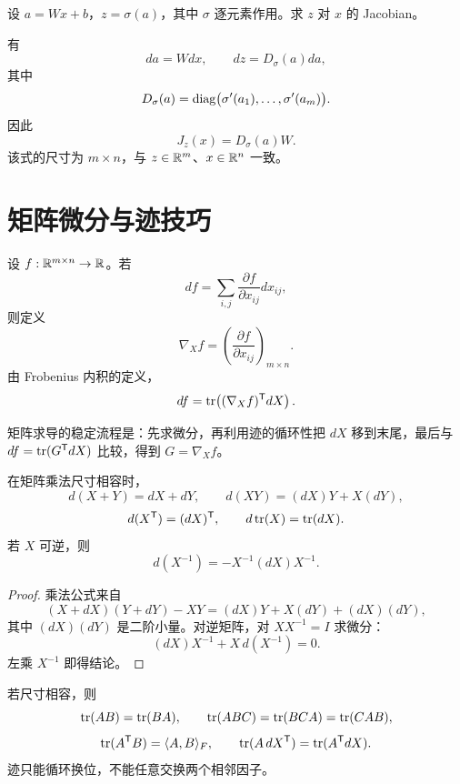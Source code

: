 \begin{example}[title={仿射变换后的逐元素函数}]
设 $a=Wx+b$，$z=\sigma(a)$，其中 $\sigma$ 逐元素作用。求 $z$ 对 $x$ 的 Jacobian。
\begin{solution}
有
\[
da=Wdx,
\qquad
dz=D_\sigma(a)da,
\]
其中
\[
D_\sigma(a)=\operatorname{diag}\bigl(\sigma'(a_1),\ldots,\sigma'(a_m)\bigr).
\]
因此
\[
J_z(x)=D_\sigma(a)W.
\]
该式的尺寸为 $m\times n$，与 $z\in\mathbb{R}^m$、$x\in\mathbb{R}^n$ 一致。
\end{solution}
\end{example}

\section{矩阵微分与迹技巧}

\begin{definition}[矩阵变量的梯度]
设 $f:\mathbb{R}^{m\times n}\to\mathbb{R}$。若
\[
df=\sum_{i,j}\frac{\partial f}{\partial x_{ij}}dx_{ij},
\]
则定义
\[
\nabla_Xf=\left(\frac{\partial f}{\partial x_{ij}}\right)_{m\times n}.
\]
由 Frobenius 内积的定义，
\[
df=\operatorname{tr}\!\left((\nabla_Xf)^{\mathsf T}dX\right).
\]
\end{definition}

矩阵求导的稳定流程是：先求微分，再利用迹的循环性把 $dX$ 移到末尾，最后与
$df=\operatorname{tr}(G^{\mathsf T}dX)$ 比较，得到 $G=\nabla_Xf$。

\begin{proposition}[基本微分法则]
在矩阵乘法尺寸相容时，
\[
d(X+Y)=dX+dY,
\qquad
d(XY)=(dX)Y+X(dY),
\]
\[
d(X^{\mathsf T})=(dX)^{\mathsf T},
\qquad
d\operatorname{tr}(X)=\operatorname{tr}(dX).
\]
若 $X$ 可逆，则
\[
d(X^{-1})=-X^{-1}(dX)X^{-1}.
\]
\end{proposition}
\begin{proof}
乘法公式来自
\[
(X+dX)(Y+dY)-XY=(dX)Y+X(dY)+(dX)(dY),
\]
其中 $(dX)(dY)$ 是二阶小量。对逆矩阵，对 $XX^{-1}=I$ 求微分：
\[
(dX)X^{-1}+X\,d(X^{-1})=0.
\]
左乘 $X^{-1}$ 即得结论。
\end{proof}

\begin{proposition}[迹的常用恒等式]
若尺寸相容，则
\[
\operatorname{tr}(AB)=\operatorname{tr}(BA),
\qquad
\operatorname{tr}(ABC)=\operatorname{tr}(BCA)=\operatorname{tr}(CAB),
\]
\[
\operatorname{tr}(A^{\mathsf T}B)=\langle A,B\rangle_F,
\qquad
\operatorname{tr}(A\,dX^{\mathsf T})=\operatorname{tr}(A^{\mathsf T}dX).
\]
迹只能循环换位，不能任意交换两个相邻因子。
\end{proposition}

